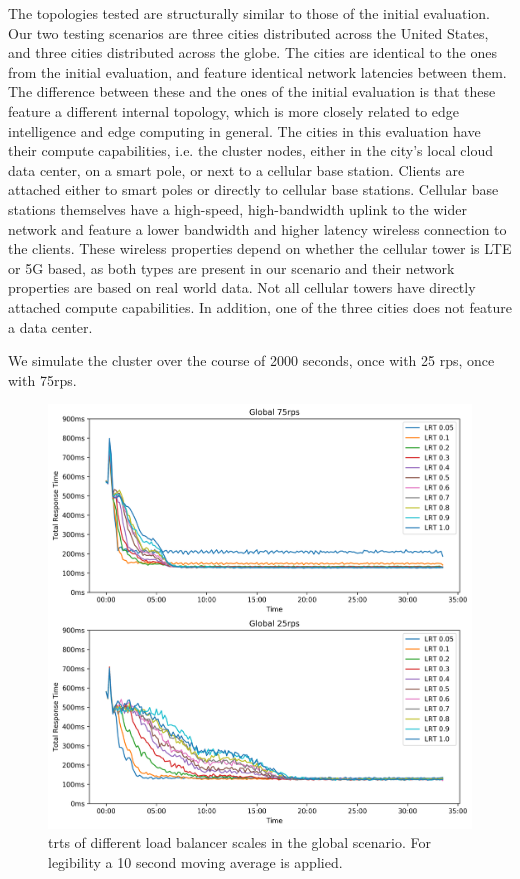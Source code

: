 The topologies tested are structurally similar to those of the initial evaluation.
Our two testing scenarios are three cities distributed across the United States, and three cities distributed across the globe.
The cities are identical to the ones from the initial evaluation, and feature identical network latencies between them.
The difference between these and the ones of the initial evaluation is that these feature a different internal topology, which is more closely related to edge intelligence\cite{rauschEdgeIntelligenceConvergence2019} and edge computing in general.
The cities in this evaluation have their compute capabilities, i.e. the cluster nodes, either in the city's local cloud data center, on a smart pole, or next to a cellular base station.
Clients are attached either to smart poles or directly to cellular base stations.
Cellular base stations themselves have a high-speed, high-bandwidth uplink to the wider network and feature a lower bandwidth and higher latency wireless connection to the clients.
These wireless properties depend on whether the cellular tower is LTE or 5G based, as both types are present in our scenario and their network properties are based on real world data\cite{braudMulticarrierMeasurementStudy2019}.
Not all cellular towers have directly attached compute capabilities.
In addition, one of the three cities does not feature a data center.

We simulate the cluster over the course of 2000 seconds, once with 25 \gls{rps}, once with 75\gls{rps}.



\begin{figure}
    \centering
    \includegraphics[width=\linewidth]{graphics/graphs/global_lb_scale_corrected.png}
    \caption{\glspl{trt} of different load balancer scales in the global scenario. For legibility a 10 second moving average is applied.}
    \label{fig:lb_scale_global}
\end{figure}

